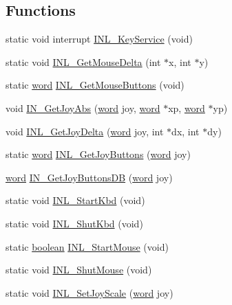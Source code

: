 \subsection*{Functions}
\begin{DoxyCompactItemize}
\item 
static void interrupt \hyperlink{ID__IN_8C_a5a8ff6b26176707dda1b18ae13602429}{INL\_\-KeyService} (void)
\item 
static void \hyperlink{ID__IN_8C_a8fc59bb3511dd04107773f88b3063763}{INL\_\-GetMouseDelta} (int $\ast$x, int $\ast$y)
\item 
static \hyperlink{ID__HEAD_8H_abad51e07ab6d26bec9f1f786c8d65bcd}{word} \hyperlink{ID__IN_8C_a4eb848df1ba13e0b61452d4b69b54b0c}{INL\_\-GetMouseButtons} (void)
\item 
void \hyperlink{ID__IN_8C_aa9699bbe72cdd2c7a2f8d5f291ec1e76}{IN\_\-GetJoyAbs} (\hyperlink{ID__HEAD_8H_abad51e07ab6d26bec9f1f786c8d65bcd}{word} joy, \hyperlink{ID__HEAD_8H_abad51e07ab6d26bec9f1f786c8d65bcd}{word} $\ast$xp, \hyperlink{ID__HEAD_8H_abad51e07ab6d26bec9f1f786c8d65bcd}{word} $\ast$yp)
\item 
void \hyperlink{ID__IN_8C_ad02d54392fab25e9c6e4208ba8c8baab}{INL\_\-GetJoyDelta} (\hyperlink{ID__HEAD_8H_abad51e07ab6d26bec9f1f786c8d65bcd}{word} joy, int $\ast$dx, int $\ast$dy)
\item 
static \hyperlink{ID__HEAD_8H_abad51e07ab6d26bec9f1f786c8d65bcd}{word} \hyperlink{ID__IN_8C_a15454e5c5f20b31d906b8f49c34ae67b}{INL\_\-GetJoyButtons} (\hyperlink{ID__HEAD_8H_abad51e07ab6d26bec9f1f786c8d65bcd}{word} joy)
\item 
\hyperlink{ID__HEAD_8H_abad51e07ab6d26bec9f1f786c8d65bcd}{word} \hyperlink{ID__IN_8C_a18fd13dd18fda00b1415818795f117b4}{IN\_\-GetJoyButtonsDB} (\hyperlink{ID__HEAD_8H_abad51e07ab6d26bec9f1f786c8d65bcd}{word} joy)
\item 
static void \hyperlink{ID__IN_8C_a449a040feca2ce4fb434d6e04dc2f7c4}{INL\_\-StartKbd} (void)
\item 
static void \hyperlink{ID__IN_8C_a4b4b0638af5d09c616ee26ab55f32240}{INL\_\-ShutKbd} (void)
\item 
static \hyperlink{ID__HEAD_8H_a7c6368b321bd9acd0149b030bb8275ed}{boolean} \hyperlink{ID__IN_8C_a7910b162b75d142f547743f0b42498ae}{INL\_\-StartMouse} (void)
\item 
static void \hyperlink{ID__IN_8C_aead9805eb3ed448a0e173e4581d107c0}{INL\_\-ShutMouse} (void)
\item 
static void \hyperlink{ID__IN_8C_a7bab419f6ff823c5210ad1492cd3a686}{INL\_\-SetJoyScale} (\hyperlink{ID__HEAD_8H_abad51e07ab6d26bec9f1f786c8d65bcd}{word} joy)

\end{DoxyCompactItemize}
